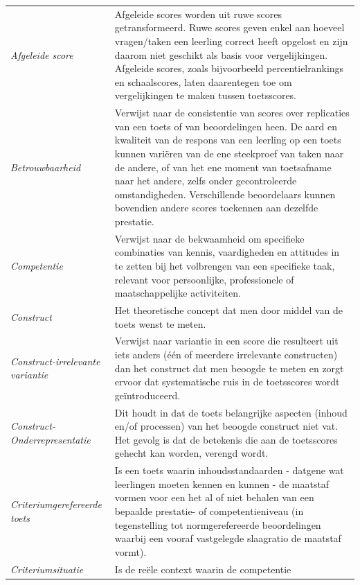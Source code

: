\documentclass[
  letterpaper,
]{report}
\begin{document}
\begin{longtable}[]{@{}
  >{\raggedright\arraybackslash}p{}
  >{\raggedright\arraybackslash}p{}@{}}
\toprule
\endhead
\emph{Afgeleide score} & Afgeleide scores worden uit ruwe scores
getransformeerd. Ruwe scores geven enkel aan hoeveel vragen/taken een
leerling correct heeft opgelost en zijn daarom niet geschikt als basis
voor vergelijkingen. Afgeleide scores, zoals bijvoorbeeld
percentielrankings en schaalscores, laten daarentegen toe om
vergelijkingen te maken tussen toetsscores. \\
\emph{Betrouwbaarheid} & Verwijst naar de consistentie van scores over
replicaties van een toets of van beoordelingen heen. De aard en
kwaliteit van de respons van een leerling op een toets kunnen variëren
van de ene steekproef van taken naar de andere, of van het ene moment
van toetsafname naar het andere, zelfs onder gecontroleerde
omstandigheden. Verschillende beoordelaars kunnen bovendien andere
scores toekennen aan dezelfde prestatie. \\
\emph{Competentie} & Verwijst naar de bekwaamheid om specifieke
combinaties van kennis, vaardigheden en attitudes in te zetten bij het
volbrengen van een specifieke taak, relevant voor persoonlijke,
professionele of maatschappelijke activiteiten. \\
\emph{Construct} & Het theoretische concept dat men door middel van de
toets wenst te meten. \\
\emph{Construct-irrelevante variantie} & Verwijst naar variantie in een
score die resulteert uit iets anders (één of meerdere irrelevante
constructen) dan het construct dat men beoogde te meten en zorgt ervoor
dat systematische ruis in de toetsscores wordt geïntroduceerd. \\
\emph{Construct-Onderrepresentatie} & Dit houdt in dat de toets
belangrijke aspecten (inhoud en/of processen) van het beoogde construct
niet vat. Het gevolg is dat de betekenis die aan de toetsscores gehecht
kan worden, verengd wordt. \\
\emph{Criteriumgerefereerde toets} & Is een toets waarin
inhoudsstandaarden - datgene wat leerlingen moeten kennen en kunnen - de
maatstaf vormen voor een het al of niet behalen van een bepaalde
prestatie- of competentieniveau (in tegenstelling tot normgerefereerde
beoordelingen waarbij een vooraf vastgelegde slaagratio de maatstaf
vormt). \\
\emph{Criteriumsituatie } & Is de reële context waarin de competentie

\end{longtable}
\end{document}
